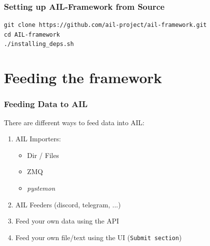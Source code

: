 \documentclass[10pt,aspectratio=169, colorlinks=true, linkcolor=circlBlue]{beamer}
\begin{document}
\begin{frame}[fragile]
    \frametitle{Setting up AIL-Framework from Source}

    \begin{tcolorbox}[colback=black!85, coltext=green, title=Installation Steps, fonttitle=\bfseries, arc=2mm, boxrule=0.4pt]
\begin{verbatim}
git clone https://github.com/ail-project/ail-framework.git
cd AIL-framework
./installing_deps.sh
\end{verbatim}
    \end{tcolorbox}

\end{frame}

\section{Feeding the framework}

\begin{frame}
\frametitle{Feeding Data to AIL}
    There are different ways to feed data into AIL:
    \begin{enumerate}
        \item AIL Importers:
            \begin{itemize}
                \item Dir / Files
                \item ZMQ
                \item \textit{pystemon}
            \end{itemize}
        \item AIL Feeders (discord, telegram, ...)
        \item Feed your own data using the API
        \item Feed your own file/text using the UI (\texttt{Submit section})
    \end{enumerate}
\end{frame}
\end{document}

